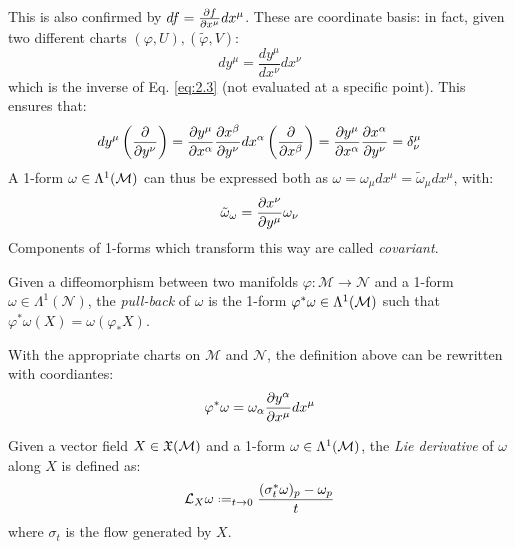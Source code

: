 This is also confirmed by $ df = \frac{\partial f}{\partial x^{\mu}} dx^{\mu} $. These are coordinate basis: in fact, given two different charts $ (\varphi,U), (\tilde{\varphi},V) $:
\begin{equation}
  dy^{\mu} = \frac{dy^{\mu}}{dx^{\nu}}dx^{\nu}
  \label{eq:}
\end{equation}
which is the inverse of Eq. \ref{eq:2.3} (not evaluated at a specific point). This ensures that:
\begin{equation*}
  dy^{\mu}\left( \frac{\partial}{\partial y^{\nu}} \right) = \frac{\partial y^{\mu}}{\partial x^{\alpha}} \frac{\partial x^{\beta}}{\partial y^{\nu}} dx^{\alpha}\left( \frac{\partial}{\partial x^{\beta}} \right) = \frac{\partial y^{\mu}}{\partial x^{\alpha}} \frac{\partial x^{\alpha}}{\partial y^{\nu}} = \delta^{\mu}_{\nu}
\end{equation*}
A 1-form $ \omega \in \Lambda^1(\mathcal{M}) $ can thus be expressed both as $ \omega = \omega_{\mu} dx^{\mu} = \tilde{\omega}_{\mu} dx^{\mu} $, with:
\begin{equation}
  \tilde{\omega}_{\omega} = \frac{\partial x^{\nu}}{\partial y^{\mu}} \omega_{\nu}
  \label{eq:2.19}
\end{equation}
Components of 1-forms which transform this way are called \textit{covariant}.

\begin{definition}
  Given a diffeomorphism between two manifolds $ \varphi : \mathcal{M} \rightarrow \mathcal{N} $ and a 1-form $ \omega \in \Lambda^1(\mathcal{N}) $, the \textit{pull-back} of $ \omega $ is the 1-form $ \varphi^*\omega \in \Lambda^1(\mathcal{M}) $ such that $ \varphi^*\omega(X) = \omega(\varphi_*X) $.
\end{definition}

With the appropriate charts on $ \mathcal{M} $ and $ \mathcal{N} $, the definition above can be rewritten with coordiantes:
\begin{equation}
  \varphi^*\omega = \omega_{\alpha} \frac{\partial y^{\alpha}}{\partial x^{\mu}} dx^{\mu}
  \label{eq:2.20}
\end{equation}

\begin{definition}
  Given a vector field $ X \in \mathfrak{X}(\mathcal{M}) $ and a 1-form $ \omega \in \Lambda^1(\mathcal{M}) $, the \textit{Lie derivative} of $ \omega $ along $ X $ is defined as:
  \begin{equation}
    \ld_X \omega \defeq_{t \rightarrow 0} \frac{(\sigma_t^* \omega)_p - \omega_p}{t}
    \label{eq:2.21}
  \end{equation}
  where $ \sigma_t $ is the flow generated by $ X $.
\end{definition}

